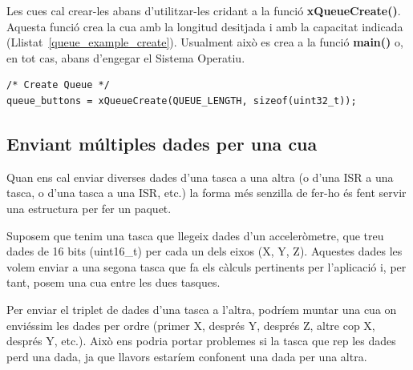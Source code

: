 Les cues cal crear-les abans d'utilitzar-les cridant a la funció {\bf xQueueCreate()}. Aquesta funció crea la cua amb la longitud desitjada i amb la capacitat indicada (Llistat~\ref{queue_example_create}).
Usualment això es crea a la funció {\bf main()} o, en tot cas, abans d'engegar el Sistema Operatiu.

\begin{lstlisting}[style=customc, label=queue_example_create, caption=Creació d'una cua]
/* Create Queue */
queue_buttons = xQueueCreate(QUEUE_LENGTH, sizeof(uint32_t));
\end{lstlisting}

%
%
%

\subsection{Enviant múltiples dades per una cua}
\label{sub:dades_cua}

Quan ens cal enviar diverses dades d'una tasca a una altra (o d'una ISR a una tasca, o d'una tasca a una ISR, etc.) la forma més senzilla de fer-ho és fent servir una estructura per fer un paquet.

Suposem que tenim una tasca que llegeix dades d'un acceleròmetre, que treu dades de 16 bits (uint16\_t) per cada un dels eixos (X, Y, Z). Aquestes dades les volem enviar a una segona tasca que fa els càlculs pertinents per l'aplicació i, per tant, posem una cua entre les dues tasques.

Per enviar el triplet de dades d'una tasca a l'altra, podríem muntar una cua on enviéssim les dades per ordre (primer X, després Y, després Z, altre cop X, després Y, etc.). Això ens podria portar problemes si la tasca que rep les dades perd una dada, ja que llavors estaríem confonent una dada per una altra.

